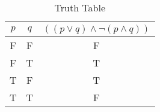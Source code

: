 \begin{table}[ht]
\caption{Truth Table}
\centering
\begin{tabular}{|c|c||c|}
\hline
$ p $ & $ q $ & $ ((p \vee q) \wedge  \neg (p \wedge q)) $ \\
\hline
F & F & F \\
F & T & T \\
T & F & T \\
T & T & F \\
\hline
\end{tabular}
\label{table:tt1}
\end{table}
